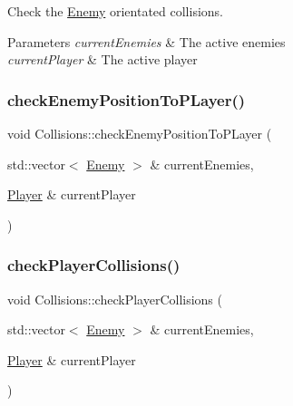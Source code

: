 Check the \hyperlink{class_enemy}{Enemy} orientated collisions. 


\begin{DoxyParams}{Parameters}
{\em current\+Enemies} & The active enemies \\
\hline
{\em current\+Player} & The active player \\
\hline
\end{DoxyParams}
\mbox{\label{class_collisions_a7ea0eaf049794a750a9115ff47eb3c45}} 
\subsubsection{\texorpdfstring{check\+Enemy\+Position\+To\+P\+Layer()}{checkEnemyPositionToPLayer()}}
{\footnotesize\ttfamily void Collisions\+::check\+Enemy\+Position\+To\+P\+Layer (\begin{DoxyParamCaption}\item[{std\+::vector$<$ \hyperlink{class_enemy}{Enemy} $>$ \&}]{current\+Enemies,  }\item[{\hyperlink{class_player}{Player} \&}]{current\+Player }\end{DoxyParamCaption})\hspace{0.3cm}{\ttfamily [private]}}

\mbox{\label{class_collisions_a990174c72f4771e6c2a8c014bd873513}} 
\subsubsection{\texorpdfstring{check\+Player\+Collisions()}{checkPlayerCollisions()}}
{\footnotesize\ttfamily void Collisions\+::check\+Player\+Collisions (\begin{DoxyParamCaption}\item[{std\+::vector$<$ \hyperlink{class_enemy}{Enemy} $>$ \&}]{current\+Enemies,  }\item[{\hyperlink{class_player}{Player} \&}]{current\+Player }\end{DoxyParamCaption})}



